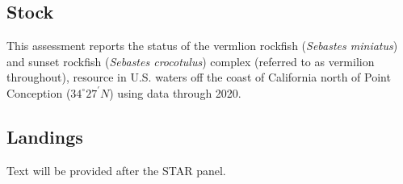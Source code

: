 \documentclass[
  english,
  a4paper,
]{article}
\begin{document}
\hypertarget{stock}{%
\subsection*{Stock}\label{stock}}

This assessment reports the status of the vermlion rockfish (\emph{Sebastes miniatus})
and sunset rockfish (\emph{Sebastes crocotulus}) complex (referred to as vermilion
throughout), resource in U.S. waters off the coast of California north
of Point Conception ($34^\circ 27^\prime N$) using data through 2020.

\hypertarget{landings}{%
\subsection*{Landings}\label{landings}}

Text will be provided after the STAR panel.
\end{document}
